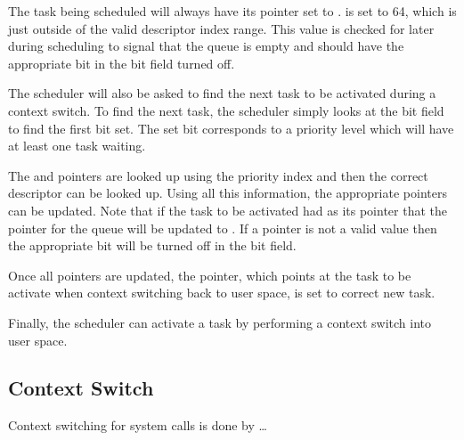 \documentclass[pdftex,10pt,a4paper]{article}
\begin{document}
The task being scheduled will always have its  pointer set
to .  is set to 64, which is just
outside of the valid descriptor index range. This value is checked for
later during scheduling to signal that the queue is empty and should
have the appropriate bit in the bit field turned off.

The scheduler will also be asked to find the next task to be
activated during a context switch. To find the next task, the
scheduler simply looks at the bit field to find the first bit set. The
set bit corresponds to a priority level which will have at least one
task waiting.

The  and  pointers are looked up using the
priority index and then the correct descriptor can be looked up. Using
all this information, the appropriate pointers can be updated. Note
that if the task to be activated had  as its 
pointer that the  pointer for the queue will be updated to
. If a  pointer is not a valid value then the
appropriate bit will be turned off in the bit field.

Once all pointers are updated, the  pointer, which
points at the task to be activate when context switching back to user
space, is set to correct new task.

Finally, the scheduler can activate a task by performing a context
switch into user space.

\subsection*{Context Switch}

Context switching for system calls is done by \ldots
\end{document}
